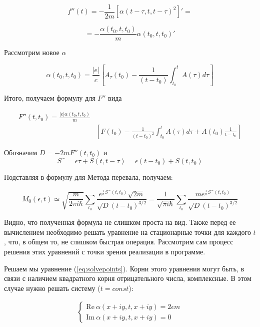 \documentclass[14pt]{extarticle}
\renewcommand{\Re}{\mathrm{Re}}
\renewcommand{\Im}{\mathrm{Im}}
\renewcommand{\Re}{\mathrm{Re}}
\renewcommand{\Im}{\mathrm{Im}}
\begin{document}
$$
f''(t) = -\frac{1}{2m}\left[\alpha(t-\tau, t, t-\tau)^2\right]' =
$$

$$
= -\frac{\alpha(t_0, t, t_0)}{m} \alpha(t_0, t, t_0)'
$$

Рассмотрим новое $\alpha$

$$
\alpha(t_0, t, t_0) = \frac{|e|}{c} \left[A_{\tau}(t_0) - \frac{1}{(t-t_0)}\int_{t_0}^{t}A(\tau) d\tau\right]
$$






Итого, получаем формулу для $F''$ вида

\begin{eqnarray}
	F''(t, t_0) = \frac{|e|\alpha(t_0, t, t_0)}{m} \nonumber \\
	& \left[F(t_0) - \frac{1}{(t - t_0)^2} \int_{t_0}^{t}A(\tau)d\tau + A(t_0) \frac{1}{t-t_0} \right] \nonumber
\end{eqnarray}


Обозначим $D = - 2 m F''(t, t_0)$ и $$S^\sim = \epsilon \tau + S(t, t-\tau) = \epsilon(t-t_0) + S(t, t_0)$$

Подставляя в формулу для Метода перевала, получаем:

$$
M_0(\epsilon, t) \simeq \sqrt{\frac{m}{2\pi i \hbar}}\sum_{t_0}\frac{e^{\frac{i}{\hbar}S^\sim(t, t_0)} \sqrt{2m}}{\sqrt{D} (t-t_0)^{3/2}} = \frac{1}{\sqrt{\pi i \hbar}}\sum_{t_0}\frac{me^{\frac{i}{\hbar}S^\sim(t, t_0)} }{\sqrt{D} (t-t_0)^{3/2}}
$$

Видно, что полученная формула не слишком проста на вид. Также перед ее вычислением необходимо решать уравнение на стационарные точки для каждого $t$, что, в общем то, не слишком быстрая операция. Рассмотрим сам процесс решения этих уравнений с точки зрения реализации в программе.

Решаем мы уравнение (\ref{eq:solvepoints}). Корни этого уравнения могут быть, в связи с наличием квадратного корня отрицательного числа, комплексные. В этом случае нужно решать систему ($t = const$):

\begin{eqnarray}
\begin{cases}
	\Re \ \alpha(x+i y, t, x+i y) = 2\epsilon m \nonumber\\
	\Im \ \alpha(x+i y, t, x+i y) = 0 \nonumber
\end{cases}
\end{eqnarray}
\end{document}
